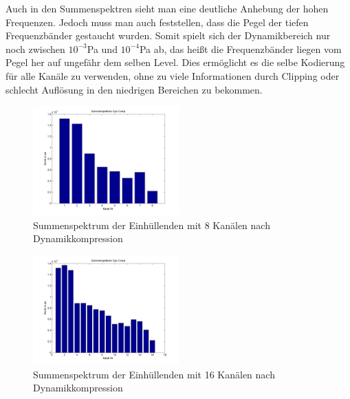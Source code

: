\documentclass[conference]{IEEEtran}
\begin{document}
\begin{compactenum}[a)]
\newpage
Auch in den Summenspektren sieht man eine deutliche Anhebung der hohen Frequenzen. Jedoch muss man auch feststellen, dass die Pegel der tiefen Frequenzbänder gestaucht wurden. Somit spielt sich der Dynamikbereich nur noch zwischen $10^{-3}$Pa und $10^{-4}$Pa ab, das heißt die Frequenzbänder liegen vom Pegel her auf ungefähr dem selben Level. Dies ermöglicht es die selbe Kodierung für alle Kanäle zu verwenden, ohne zu viele Informationen durch Clipping oder schlecht Auflösung in den niedrigen Bereichen zu bekommen. 
\begin{figure}
	\centering
	\includegraphics[width=0.5\textwidth]{img/sum_dyn8.png}
	\vspace{-10pt}
	\caption{Summenspektrum der Einhüllenden mit 8 Kanälen nach Dynamikkompression}
	\vspace{-10pt}
	\label{fig:sum_dyn8}
\end{figure}

\begin{figure}
	\centering
	\includegraphics[width=0.5\textwidth]{img/sum_dyn16.png}
	\vspace{-10pt}
	\caption{Summenspektrum der Einhüllenden mit 16 Kanälen nach Dynamikkompression}
	\vspace{-10pt}
	\label{fig:sum_dyn16}
\end{figure}


\end{compactenum}
\end{document}
